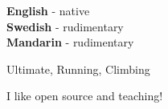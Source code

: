 \documentclass[9pt]{developercv} %
\begin{document}

\begin{minipage}[t]{0.3\textwidth} %
	\vspace{-\baselineskip} %

	
	\textbf{English} - native\\
	\textbf{Swedish} - rudimentary\\
	\textbf{Mandarin} - rudimentary
\end{minipage}
\hfill %
\begin{minipage}[t]{0.3\textwidth} %
	\vspace{-\baselineskip} %
	
	
	Ultimate, Running, Climbing
\end{minipage}
\hfill %
\begin{minipage}[t]{0.3\textwidth} %
	\vspace{-\baselineskip} %
	
	
	I like open source and teaching!
\end{minipage}

\end{document}
